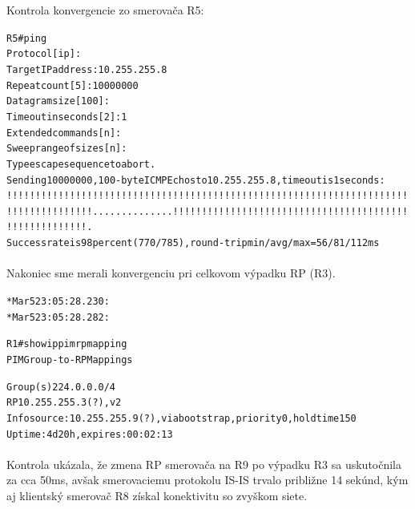 \documentclass[12pt,twoside,a4paper]{report}
\begin{document}
Kontrola konvergencie zo smerovača R5:

\noindent
{\selectfont
\begin{small}
\begin{alltt}

R5#ping        
Protocol [ip]:             
Target IP address: 10.255.255.8
Repeat count [5]: 10000000    
Datagram size [100]:
Timeout in seconds [2]: 1           
Extended commands [n]:
Sweep range of sizes [n]:
Type escape sequence to abort.
Sending 10000000, 100-byte ICMP Echos to 10.255.255.8, timeout is 1 seconds:
!!!!!!!!!!!!!!!!!!!!!!!!!!!!!!!!!!!!!!!!!!!!!!!!!!!!!!!!!!!!!!!!!!!!!!
!!!!!!!!!!!!!!!..............!!!!!!!!!!!!!!!!!!!!!!!!!!!!!!!!!!!!!!!!!
!!!!!!!!!!!!!!.
Success rate is 98 percent (770/785), round-trip min/avg/max = 56/81/112 ms

\end{alltt}
\end{small}
}

\paragraph{}
Nakoniec sme merali konvergenciu pri celkovom výpadku RP (R3).

\noindent
{\selectfont
\begin{small}
\begin{alltt}
*Mar  5 23:05:28.230: %
*Mar  5 23:05:28.282: %
\end{alltt}
\end{small}
}

\noindent
{\selectfont
\begin{small}
\begin{alltt}

R1#show ip pim rp mapping
PIM Group-to-RP Mappings

Group(s) 224.0.0.0/4
  RP 10.255.255.3 (?), v2
    Info source: 10.255.255.9 (?), via bootstrap, priority 0, holdtime 150
         Uptime: 4d20h, expires: 00:02:13

\end{alltt}
\end{small}
}

\paragraph{}
Kontrola ukázala, že zmena RP smerovača na R9 po výpadku R3 sa uskutočnila za cca 50ms, avšak smerovaciemu protokolu IS-IS trvalo približne 14 sekúnd, kým aj klientský smerovač R8 získal konektivitu so zvyškom siete.
\end{document}

